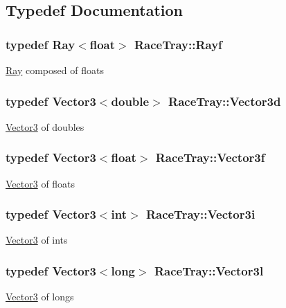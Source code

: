 \subsection{Typedef Documentation}
\hypertarget{group___math_ga5fdea6c2a8db84c0cc5b7aaeeb48b17a}{
\subsubsection[{Rayf}]{\setlength{\rightskip}{0pt plus 5cm}typedef Ray$<$float$>$ {\bf Race\-Tray\-::\-Rayf}}}\label{group___math_ga5fdea6c2a8db84c0cc5b7aaeeb48b17a}
\hyperlink{class_race_tray_1_1_ray}{Ray} composed of floats \hypertarget{group___math_ga3cf322716609965f0debf240c4eb8ab6}{
\subsubsection[{Vector3d}]{\setlength{\rightskip}{0pt plus 5cm}typedef Vector3$<$double$>$ {\bf Race\-Tray\-::\-Vector3d}}}\label{group___math_ga3cf322716609965f0debf240c4eb8ab6}
\hyperlink{class_race_tray_1_1_vector3}{Vector3} of doubles \hypertarget{group___math_gadb6fa781064c3c3c9b13eb984adae162}{
\subsubsection[{Vector3f}]{\setlength{\rightskip}{0pt plus 5cm}typedef Vector3$<$float$>$ {\bf Race\-Tray\-::\-Vector3f}}}\label{group___math_gadb6fa781064c3c3c9b13eb984adae162}
\hyperlink{class_race_tray_1_1_vector3}{Vector3} of floats \hypertarget{group___math_ga732981bed6c760c8857decb1e04b2118}{
\subsubsection[{Vector3i}]{\setlength{\rightskip}{0pt plus 5cm}typedef Vector3$<$int$>$ {\bf Race\-Tray\-::\-Vector3i}}}\label{group___math_ga732981bed6c760c8857decb1e04b2118}
\hyperlink{class_race_tray_1_1_vector3}{Vector3} of ints \hypertarget{group___math_ga7d214bec28c2592b61b69cbf169d45cf}{
\subsubsection[{Vector3l}]{\setlength{\rightskip}{0pt plus 5cm}typedef Vector3$<$long$>$ {\bf Race\-Tray\-::\-Vector3l}}}\label{group___math_ga7d214bec28c2592b61b69cbf169d45cf}
\hyperlink{class_race_tray_1_1_vector3}{Vector3} of longs 

